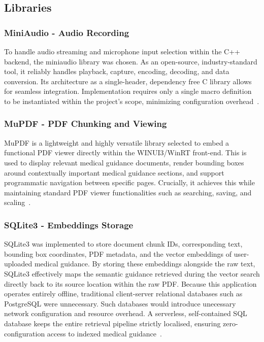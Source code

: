 \subsection{Libraries}
\label{app:libraries}
\subsubsection{MiniAudio - Audio Recording}
To handle audio streaming and microphone input selection within the C++ backend, the miniaudio library was chosen. As an open-source, industry-standard tool, it reliably handles playback, capture, encoding, decoding, and data conversion. Its architecture as a single-header, dependency free C library allows for seamless integration. Implementation requires only a single macro definition to be instantiated within the project's scope, minimizing configuration overhead~\cite{mackminiaudio}.

\subsubsection{MuPDF - PDF Chunking and Viewing}
MuPDF is a lightweight and highly versatile library selected to embed a functional PDF viewer directly within the WINUI3/WinRT front-end. This is used to display relevant medical guidance documents, render bounding boxes around contextually important medical guidance sections, and support programmatic navigation between specific pages. Crucially, it achieves this while maintaining standard PDF viewer functionalities such as searching, saving, and scaling~\cite{mupdf}.

\subsubsection{SQLite3 - Embeddings Storage}
SQLite3 was implemented to store document chunk IDs, corresponding text, bounding box coordinates, PDF metadata, and the vector embeddings of user-uploaded medical guidance. By storing these embeddings alongside the raw text, SQLite3 effectively maps the semantic guidance retrieved during the vector search directly back to its source location within the raw PDF. Because this application operates entirely offline, traditional client-server relational databases such as PostgreSQL were unnecessary. Such databases would introduce unecessary network configuration and resource overhead. A serverless, self-contained SQL database keeps the entire retrieval pipeline strictly localised, ensuring zero-configuration access to indexed medical guidance~\cite{sqlite}.

